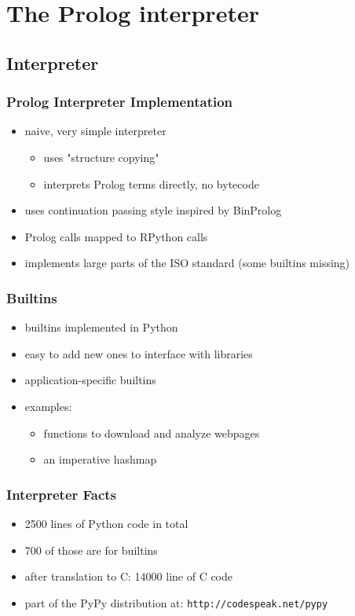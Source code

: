 \documentclass[utf8]{beamer}
\begin{document}
\section{The Prolog interpreter}
\subsection{Interpreter}
\begin{frame}
  \frametitle{Prolog Interpreter Implementation}
  \begin{itemize}
  \item
    naive, very simple interpreter
    \begin{itemize}
    \item uses "structure copying"
    \item interprets Prolog terms directly, no bytecode
    \end{itemize}
  \item
    uses continuation passing style inspired by BinProlog
  \item
    Prolog calls mapped to RPython calls
  \item
    implements large parts of the ISO standard (some builtins missing)
  \end{itemize}
\end{frame}




\begin{frame}
  \frametitle{Builtins}
  \begin{itemize}
  \item
    builtins implemented in Python
  \item
    easy to add new ones to interface with libraries
  \item
    application-specific builtins
  \item
    examples:
    \begin{itemize}
    \item functions to download and analyze webpages
    \item an imperative hashmap
    \end{itemize}
  \end{itemize}
\end{frame}


\begin{frame}
  \frametitle{Interpreter Facts}
  \begin{itemize}
  \item
    2500 lines of Python code in total
  \item
    700 of those are for builtins
  \item
    after translation to C: 14000 line of C code
  \item
    part of the PyPy distribution at:
    \texttt{http://codespeak.net/pypy}
  \end{itemize}
\end{frame}
\end{document}
